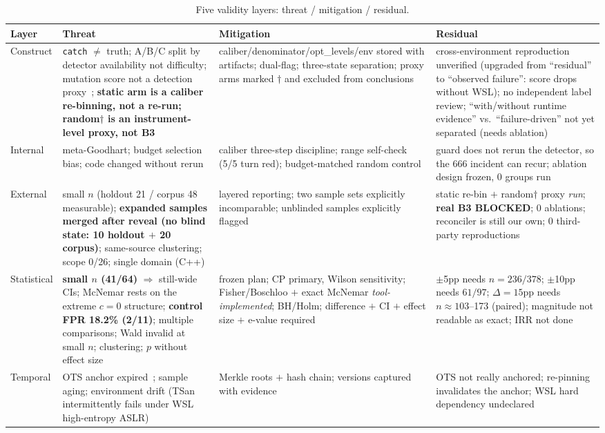 \documentclass{article}
\begin{document}
\begin{table}[t]
\caption{Five validity layers: threat / mitigation / residual.}
\label{tab:validity}
\centering
\small
\begin{tabular}{@{}p{1.8cm}p{4.4cm}p{4.0cm}p{3.6cm}@{}}
\toprule
Layer & Threat & Mitigation & Residual \\
\midrule
Construct & \texttt{catch} $\neq$ truth; A/B/C split by detector availability not difficulty; mutation score not a detection proxy~\cite{just2014mutants}; \textbf{static arm is a caliber re-binning, not a re-run; random$\dagger$ is an instrument-level proxy, not B3} & caliber/denominator/opt\_levels/env stored with artifacts; dual-flag; three-state separation; proxy arms marked $\dagger$ and excluded from conclusions & cross-environment reproduction unverified (upgraded from ``residual'' to ``observed failure'': score drops without WSL); no independent label review; ``with/without runtime evidence'' vs.\ ``failure-driven'' not yet separated (needs ablation) \\
Internal & meta-Goodhart; budget selection bias; code changed without rerun & caliber three-step discipline; range self-check (5/5 turn red); budget-matched random control & guard does not rerun the detector, so the 666 incident can recur; ablation design frozen, 0 groups run \\
External & small $n$ (holdout 21 / corpus 48 measurable); \textbf{expanded samples merged after reveal (no blind state: 10 holdout $+$ 20 corpus)}; same-source clustering; scope 0/26; single domain (C++) & layered reporting; two sample sets explicitly incomparable; unblinded samples explicitly flagged & static re-bin $+$ random$\dagger$ proxy \emph{run}; \textbf{real B3 BLOCKED}; 0 ablations; reconciler is still our own; 0 third-party reproductions \\
Statistical & \textbf{small $n$ (41/64)} $\Rightarrow$ still-wide CIs; McNemar rests on the extreme $c{=}0$ structure; \textbf{control FPR 18.2\% (2/11)}; multiple comparisons; Wald invalid at small $n$; clustering; $p$ without effect size & frozen plan; CP primary, Wilson sensitivity; Fisher/Boschloo $+$ exact McNemar \emph{tool-implemented}; BH/Holm; difference $+$ CI $+$ effect size $+$ e-value required & $\pm$5pp needs $n{=}236/378$; $\pm$10pp needs $61/97$; $\Delta{=}15$pp needs $n\approx103$--173 (paired); magnitude not readable as exact; IRR not done \\
Temporal & OTS anchor expired~\cite{opentimestamps}; sample aging; environment drift (TSan intermittently fails under WSL high-entropy ASLR) & Merkle roots $+$ hash chain; versions captured with evidence & OTS not really anchored; re-pinning invalidates the anchor; WSL hard dependency undeclared \\
\bottomrule
\end{tabular}
\end{table}
\end{document}

